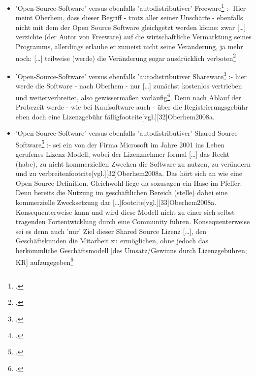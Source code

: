 \documentclass[DIV=calc,BCOR=5mm,11pt,headings=small,oneside,abstract=true, toc=bib]{scrartcl}
\begin{document}
\begin{itemize}
\begin{itemize}
    \glqq{}[\ldots] des Fehlen des Coypright Vermerks dazu (geführt),
    dass das Werk nicht den vollen urheberrechtlichen Schutz
    genoss\grqq{}\footcite[][30 Anm.152]{Oberhem2008a}
    \item 'Open-Source-Software' versus ebenfalls 'autodistributiver'
    \glqq{}Freeware\grqq{}\footcite[vgl.][31]{Oberhem2008a} :- Hier meint
    Oberhem, dass dieser Begriff - trotz aller seiner Unschärfe - ebenfalls
    nicht mit dem der Open Source Software gleichgetzt werden könne: zwar
    \glqq{}[\ldots] verzichte (der Autor von Freeware) auf die
    wirtschaftliche Vermarktung seines Programms\grqq{}, allerdings erlaube er
    zumeist nicht seine Veränderung, ja mehr noch: \glqq{}[\ldots] teilweise
    (werde) die Veränderung sogar ausdrücklich
    verboten\grqq{}\footcite[vgl.][31]{Oberhem2008a}
    \item 'Open-Source-Software' versus ebenfalls 'autodistributiver
    \glqq{}Shareware\grqq{}\footcite[vgl.][31f]{Oberhem2008a} :- hier werde
    die Software - nach Oberhem - nur \glqq{}[\ldots] zunächst kostenlos
    vertrieben und weiterverbreitet\grqq{}, also gewissermaßen
    vorläufig\footcite[vgl.][31]{Oberhem2008a}. Denn nach \glqq{}Ablauf
    der Probezeit\grqq{} werde - wie bei Kaufsoftware auch - über die
    \glqq{}Registrierungsgebühr\grqq{} eben doch eine Lizenzgebühr
    fälligfootcite[vgl.][32]{Oberhem2008a}.
    \item 'Open-Source-Software' versus ebenfalls 'autodistributiver'
    \glqq{}Shared Source Software\grqq{}\footcite[vgl.][32f]{Oberhem2008a} :-
    sei ein von der Firma Microsoft \glqq{}im Jahre 2001 ins
    Leben gerufenes Lizenz-Modell\grqq{}, wobei der \glqq{}Lizenznehmer\grqq{}
    formal \glqq{}[\ldots] das Recht (habe), zu nicht kommerziellen
    Zwecken die Software zu nutzen, zu verändern und zu
    verbreiten\grqq{}footcite[vgl.][32]{Oberhem2008a}. Das hört sich an wie eine
    Open Source Definition. Gleichwohl liege da sozusagen ein Hase im Pfeffer:
    Denn \glqq{}bereits die Nutzung im geschäftlichen Bereich (stelle)
    dabei eine kommerzielle Zwecksetzung dar
    [\ldots]\grqq{}footcite[vgl.][33]{Oberhem2008a}. Konsequenterweise kann und
    wird diese Modell nicht zu einer sich selbst tragenden Fortentwicklung durch
    eine Community führen. Konsequenterweise sei es denn auch 'nur' \glqq{}Ziel
    dieser Shared Source Lizenz [\ldots], den Geschäftskunden die
    Mitarbeit zu ermöglichen, ohne jedoch das herkömmliche
    Geschäftsmodell [des Umsatz/Gewinns durch Lizenzgebühren; KR]
    aufzugegeben\grqq{}\footcite[vgl.][33]{Oberhem2008a}
  \end{itemize}
\end{itemize}
\end{document}
